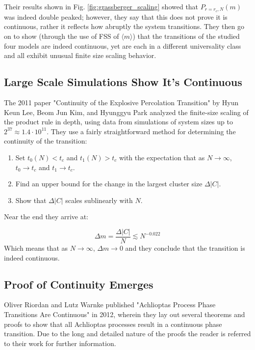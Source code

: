 Their results shown in Fig. \ref{fig:grassberger_scaling} showed that $P_{r=r_c, N}(m)$ was indeed double peaked; however, they say that this does not prove it is continuous, rather it reflects how abruptly the system transitions.
They then go on to show (through the use of FSS of $\langle m \rangle$) that the transitions of the studied four models are indeed continuous, yet are each in a different universality class and all exhibit unusual finite size scaling behavior.



\subsection{Large Scale Simulations Show It's Continuous}
The 2011 paper "Continuity of the Explosive Percolation Transition" \cite{Lee_1} by Hyun Keun Lee, Beom Jun Kim, and Hyunggyu Park analyzed the finite-size scaling of the product rule in depth, using data from simulations of system sizes up to $2^{37} \approx 1.4 \cdot 10^{11}$.
They use a fairly straightforward method for determining the continuity of the transition:

\begin{enumerate}
	\item Set $t_0(N) < t_c$ and $t_1(N) > t_c$ with the expectation that as $N \rightarrow \infty$, $t_0 \rightarrow t_c$ and $t_1 \rightarrow t_c$.
	\item Find an upper bound for the change in the largest cluster size $\Delta |C|$.
	\item Show that $\Delta |C|$ scales sublinearly with $N$.
\end{enumerate}

Near the end they arrive at:

\begin{equation}
	\Delta m = \frac{\Delta |C|}{N} \lesssim N^{-0.022}
\end{equation}
Which means that as $N \rightarrow \infty$, $\Delta m \rightarrow 0$ and they conclude that the transition is indeed continuous.



\subsection{Proof of Continuity Emerges}
Oliver Riordan and Lutz Warnke published "Achlioptas Process Phase Transitions Are
Continuous" \cite{Riordan_1} in 2012, wherein they lay out several theorems and proofs to show that all Achlioptas processes result in a continuous phase transition.
Due to the long and detailed nature of the proofs the reader is referred to their work for further information.



